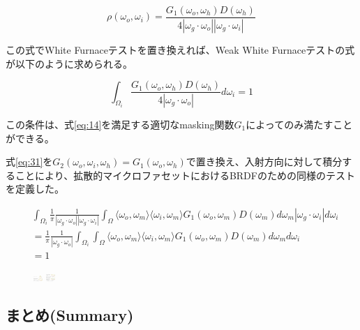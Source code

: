 \documentclass[a4j,xelatex,ja=standard]{bxjsarticle}
\begin{document}
\begin{equation}
    \rho(\omega_o, \omega_i) = \frac{G_1(\omega_o, \omega_h) D(\omega_h)}{4|\omega_g \cdot \omega_o| |\omega_g \cdot \omega_i|}
    \label{eq:35}
\end{equation}

この式でWhite Furnaceテストを置き換えれば、Weak White Furnaceテストの式が以下のように求められる。

\begin{equation}
    \boxed{
    \int_{\Omega_i} \frac{G_1(\omega_o, \omega_h) D(\omega_h)}{4|\omega_g \cdot \omega_o|} d\omega_i = 1
    }
    \label{eq:36}
\end{equation}

この条件は、式\eqref{eq:14}を満足する適切なmasking関数$G_1$によってのみ満たすことができる。

式\eqref{eq:31}を$G_2(\omega_o, \omega_i, \omega_h) = G_1(\omega_o, \omega_h)$で置き換え、入射方向に対して積分することにより、拡散的マイクロファセットにおけるBRDFのための同様のテストを定義した。

\begin{equation}
    \begin{split}
        & \int_{\Omega_i} \frac{1}{\pi} \frac{1}{|\omega_g \cdot \omega_o| |\omega_g \cdot \omega_i|} \int_{\Omega} \langle \omega_o, \omega_m \rangle \langle \omega_i, \omega_m \rangle G_1(\omega_o, \omega_m) D(\omega_m) d\omega_m |\omega_g \cdot \omega_i| d\omega_i \\
        &= \frac{1}{\pi} \frac{1}{|\omega_g \cdot \omega_o|} \int_{\Omega_i} \int_{\Omega} \langle \omega_o, \omega_m \rangle \langle \omega_i, \omega_m \rangle G_1(\omega_o, \omega_m) D(\omega_m) d\omega_m d\omega_i \\
        &= 1
    \end{split}
    \label{eq:37}
\end{equation}

\begin{figure}
    \includegraphics[width=10pt]{Figure6_1.png}
    \includegraphics[width=10pt]{Figure6_2.png}
    \caption{}
    \label{fig:6}
\end{figure}

\subsection{まとめ(Summary)}
\end{document}
